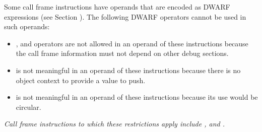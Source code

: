 Some call frame instructions have operands that are encoded
as DWARF expressions 
(see Section ). 
The following DWARF
operators cannot be used in such operands:


\begin{itemize}
\item \DWOPcalltwo, \DWOPcallfour{} 
and \DWOPcallref{} operators are 
not allowed in an operand of these instructions because
the call frame information must not depend on other
debug sections.

\item \DWOPpushobjectaddress{} is not meaningful in an operand
of these instructions because there is no object context to
provide a value to push.

\item \DWOPcallframecfa{} is not meaningful in an operand of
these instructions because its use would be circular.
\end{itemize}

\textit{Call frame instructions to which these restrictions apply
include \DWCFAdefcfaexpression, \DWCFAexpression{}
and \DWCFAvalexpression.}


